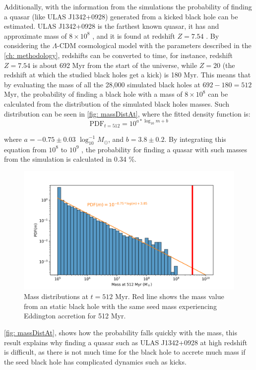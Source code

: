 	Additionally, with the information from the simulations the probability of finding a quasar (like ULAS J1342+0928) generated from a kicked black hole can be estimated. ULAS J1342+0928 is the farthest known quasar, it has and approximate mass of $8\times10^8$ \sm, and it is found at redshift $Z = 7.54$ \cite{banados2018800, paris2018sloan}. By considering the $\Lambda$-CDM cosmological model with the parameters described in the \autoref{ch: methodology}, redshifts can be converted to time, for instance, redshift $Z = 7.54$ is about 692 Myr from the start of the universe, while $Z = 20$ (the redshift at which the studied black holes get a kick) is 180 Myr. This means that by evaluating the mass of all the 28,000 simulated black holes at $692 - 180 = 512$ Myr, the probability of finding a black hole with a mass of $8\times10^8$ \sm can be calculated from the distribution of the simulated black holes masses. Such distribution can be seen in \autoref{fig: massDistAt}, where the fitted density function is:
	\begin{equation}
		\text{PDF}_{t = 512} = 10 ^ {a * \log_{10}m + b}
	\end{equation}
	
	where $a = -0.75 \pm 0.03$ $\log_{10}^{-1}M_\odot$, and $b = 3.8 \pm 0.2$. By integrating this equation from $10^8$ to $10^9$ \sm, the probability for finding a quasar with such masses from the simulation is calculated in 0.34 \%.
	\begin{figure}[h]
		\centering
		\includegraphics[width=0.8\linewidth]{"../Files/Week 14/masses_at"}
		\caption{Mass distributions at $t = 512$ Myr. Red line shows the mass value from an static black hole with the same seed mass experiencing Eddington accretion for 512 Myr.}
		\label{fig: massDistAt}
	\end{figure}

	\autoref{fig: massDistAt}, shows how the probability falls quickly with the mass, this result explains why finding a quasar such as ULAS J1342+0928 at high redshift is difficult, as there is not much time for the black hole to accrete much mass if the seed black hole has complicated dynamics such as kicks.
	
